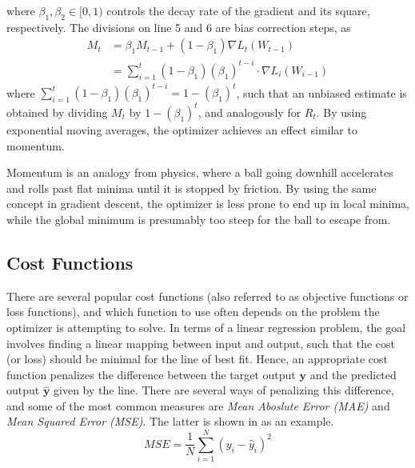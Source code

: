         where $\beta_1,\beta_2\in [0,1)$ controls the decay rate of the gradient and its square, respectively. The divisions on line 5 and 6 are bias correction steps, as
        \begin{equation}
            \begin{split}
                M_t &= \beta_1 M_{t-1}+(1-\beta_1)\nabla L_t(W_{t-1}) \\
                &= \sum_{i=1}^t (1-\beta_1)(\beta_1)^{t-i} \cdot \nabla L_i(W_{i-1})
            \end{split}
        \end{equation}
        where $\sum_{i=1}^t(1-\beta_1)(\beta_1)^{t-i} = 1-(\beta_1)^t$, such that an unbiased estimate is obtained by dividing $M_t$ by $1-(\beta_1)^t$, and analogously for $R_t$.
        By using exponential moving averages, the optimizer achieves an effect similar to momentum.
        
        
        Momentum is an analogy from physics, where a ball going downhill accelerates and rolls past flat minima until it is stopped by friction. By using the same concept in gradient descent, the optimizer is less prone to end up in local minima, while the global minimum is presumably too steep for the ball to escape from.

    \subsection{Cost Functions}
    
        There are several popular cost functions (also referred to as objective functions or loss functions), and which function to use often depends on the problem the optimizer is attempting to solve. 
        In terms of a linear regression problem, the goal involves finding a linear mapping between input and output, such that the cost (or loss) should be minimal for the line of best fit. Hence, an appropriate cost function penalizes the difference between the target output $\bm{y}$ and the predicted output $\bm{\hat{y}}$ given by the line. 
        There are several ways of penalizing this difference, and some of the most common measures are \emph{Mean Aboslute Error (MAE)} and \emph{Mean Squared Error (MSE)}. The latter is shown in  as an example.
        \begin{equation}\label{eq:mopt-mseloss}
            MSE = \frac{1}{N}\sum_{i=1}^N(y_i-\hat{y}_i)^2
        \end{equation}
        
